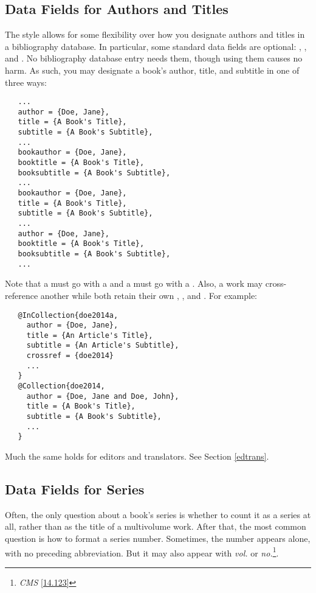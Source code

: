 \documentclass[11pt,letterpaper,oneside]{article}
\begin{document}
\subsection{Data Fields for Authors and Titles}
\label{authtitles}

The style allows for some flexibility over how you designate authors
and titles in a bibliography database. In particular, some standard
data fields are optional: , ,
and . No bibliography database entry needs
them, though using them causes no harm. As such, you may designate a
book's author, title, and subtitle in one of three ways:

\begin{verbatim}
   ...
   author = {Doe, Jane},
   title = {A Book's Title},
   subtitle = {A Book's Subtitle},
   ...
   bookauthor = {Doe, Jane},
   booktitle = {A Book's Title},
   booksubtitle = {A Book's Subtitle},
   ...
   bookauthor = {Doe, Jane},
   title = {A Book's Title},
   subtitle = {A Book's Subtitle},
   ...
   author = {Doe, Jane},
   booktitle = {A Book's Title},
   booksubtitle = {A Book's Subtitle},
   ...
\end{verbatim}

\noindent Note that a  must go with a
 and a  must go with a
. Also, a work may cross-reference another while
both retain their own , , and
. For example:

\begin{verbatim}
   @InCollection{doe2014a,
     author = {Doe, Jane},
     title = {An Article's Title},
     subtitle = {An Article's Subtitle},
     crossref = {doe2014}
     ...
   }
   @Collection{doe2014,
     author = {Doe, Jane and Doe, John},
     title = {A Book's Title},
     subtitle = {A Book's Subtitle},
     ...
   }
\end{verbatim}

\noindent Much the same holds for editors and translators. See Section
\ref{edtrans}.

\subsection{Data Fields for Series}

Often, the only question about a book's series is whether to count it
as a series at all, rather than as the title of a multivolume work.
After that, the most common question is how to format a series number.
Sometimes, the number appears alone, with no preceding abbreviation.
But it may also appear with \textit{vol.} or
\textit{no.}\footnote{\textit{CMS} \ref{14.123}}.
\end{document}
